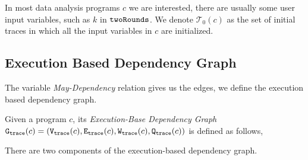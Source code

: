 %
In most data analysis programs $c$ we are interested, there are usually some user input variables, such as $k$ in $\mathtt{twoRounds}$. 
We denote $\mathcal{T}_0(c)$ as the set of initial traces in which all the input variables in $c$ are initialized.
%
\subsection{Execution Based Dependency Graph}
\label{sec:execution-base-graph-def}
%
%
%
%
The variable \emph{May-Dependency} relation gives us the edges, we define the execution based dependency graph.
\begin{defn}
\label{def:trace_graph}
Given a program ${c}$,
its \emph{Execution-Base Dependency Graph} 
$\mathtt{{G_{trace}}}({c}) = (\mathtt{{V_{trace}}}({c}), \mathtt{{E_{trace}}}({c}), \mathtt{{W_{trace}}}({c}), \mathtt{{Q_{trace}}}({c}))$ is defined as follows,
%
\highlight{\small
\[
\begin{array}{lcl}
  \traceV({c}) & := & 
  \{ 
  (x^l, w) 
  ~ \vert ~ 
  w : \mathcal{T} \to \mathbb{N}
  \land
  x^l \in \lvar(c) 
  \\ & &
  \land
  \forall \trace \in \mathcal{T}_0(c), \trace' \in \mathcal{T} \st \config{{c}, \trace} \to^{*} \config{\eskip, \trace\tracecat\vtrace'} 
  \implies w(\trace) = \vcounter(\vtrace', l) 
\}
  \\
  \traceE({c}) & := & 
  \{ 
  (x^i, w, y^j) 
  ~ \vert ~
  x^i, y^j \in \lvar(c)
  \land w \in \mathcal{P}( \mathcal{T}_0(c) \to \mathbb{N})
  \land 
  \exists \trace \in \mathcal{T}_0(c), 
  \trace_1, \trace_2 \in \mathcal{T} \st \dep(x^i, y^j,\trace_1, \trace_2, \trace_0, c)
  \\ & &
  \land \forall \trace_0 \in \mathcal{T}_0(c) \st
  w (\trace_0) = \max \left\{ | \sdiff(\trace_1, \trace_2, y)|
  ~\middle\vert~
  \forall \trace_1, \trace_2 \in \mathcal{T} \st \dep(x^i, y^j,\trace_1, \trace_2, \trace_0, c) \right\}
  \}
\end{array}
\]
}
\end{defn}
There are two components of the execution-based dependency graph. 
\\
